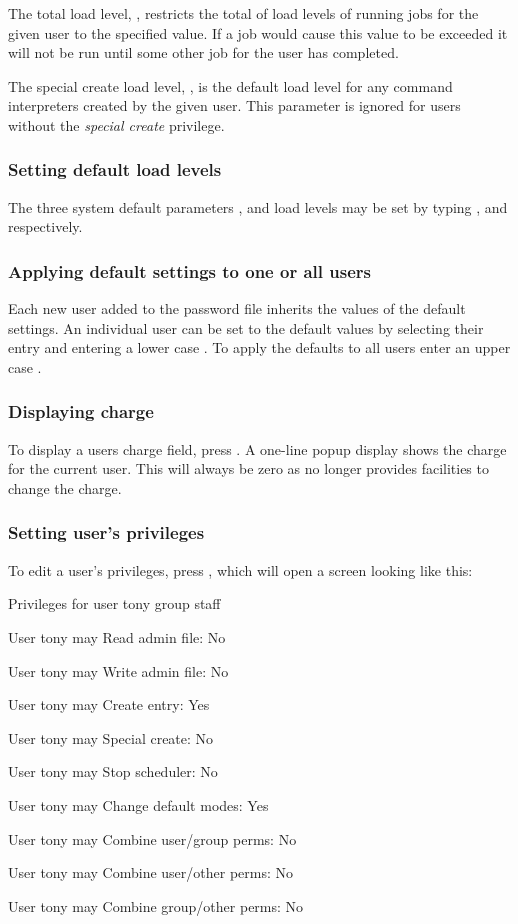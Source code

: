 The total load level, , restricts the total
of load levels of running jobs for the given user to the specified
value. If a job would cause this value to be exceeded it will not be
run until some other job for the user has completed.

The special create load level, , is the
default load level for any command interpreters created by the given
user. This parameter is ignored for users without the \textit{special
create} privilege.

\subsubsection{Setting default load levels}
The three system default parameters
,  and
 load levels may be set by typing
,  and  respectively.

\subsubsection{Applying default settings to one or all users}
Each new user added to the password file inherits the values of the
default settings. An individual user can be set to the default values
by selecting their entry and entering a lower case
. To apply the defaults to all users enter an
upper case .

\subsubsection{Displaying charge}
To display a user{\textquotesingle}s charge field, press . A one-line popup display shows the charge for
the current user. This will always be zero as \PrBtuser{} no longer provides facilities to change the charge.

\subsubsection{Setting user's privileges}
To edit a user's privileges, press , which will open a screen looking like this:

\begin{exparasmall}

Privileges for user tony group staff

\bigskip


User tony may Read admin file: No

User tony may Write admin file: No

User tony may Create entry: Yes

User tony may Special create: No

User tony may Stop scheduler: No

User tony may Change default modes: Yes

User tony may Combine user/group perms: No

User tony may Combine user/other perms: No

User tony may Combine group/other perms: No

\end{exparasmall}

